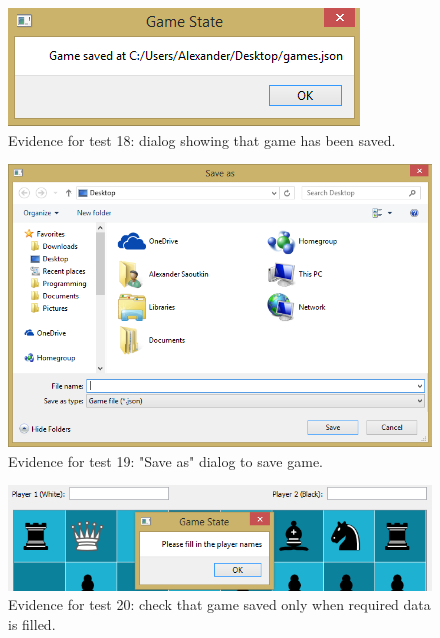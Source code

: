 \begin{figure}
	\centering
	\includegraphics{images/screenshots/test-18}
	\caption{Evidence for test 18: dialog showing that game has been saved.}
	\label{test-18}
\end{figure}
\begin{figure}
	\centering
	\includegraphics[width=1.0\textwidth]{images/screenshots/test-17}
	\caption{Evidence for test 19: "Save as" dialog to save game.}
	\label{test-19}
\end{figure}
\begin{figure}
	\centering
	\includegraphics[width=1.0\textwidth]{images/screenshots/test-20}
	\caption{Evidence for test 20: check that game saved only when required data is filled.}
	\label{test-20}
\end{figure}
